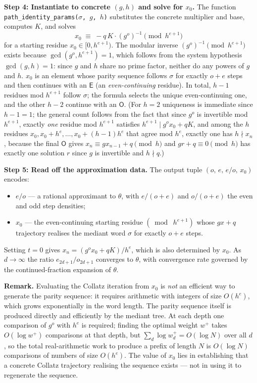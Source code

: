 \documentclass[12pt]{article}
\theoremstyle{definition}
\theoremstyle{remark}
\theoremstyle{plain}
\newcommand{\OO}{\mathsf{O}}
\newcommand{\EE}{\mathsf{E}}
\begin{document}
\medskip
\noindent\textbf{Step 4: Instantiate to concrete $(g, h)$ and solve for $x_0$.}
The function \texttt{path\_identity\_params($\sigma$, $g$, $h$)} substitutes the
concrete multiplier and base, computes $K$, and solves
\[
  x_0 \;\equiv\; -q\,K \cdot (g^o)^{-1} \pmod{h^{e+1}}
\]
for a starting residue $x_0 \in [0, h^{e+1})$.
The modular inverse $(g^o)^{-1} \pmod{h^{e+1}}$ exists because $\gcd(g^o, h^{e+1}) = 1$,
which follows from the system hypothesis $\gcd(g, h) = 1$: since $g$ and $h$ share
no prime factor, neither do any powers of $g$ and $h$.
$x_0$ is an element whose parity sequence follows $\sigma$ for exactly $o + e$ steps
and then continues with an $\EE$ (an \emph{even-continuing} residue).
In total, $h-1$ residues mod $h^{e+1}$ follow $\sigma$; the formula selects the
unique even-continuing one, and the other $h-2$ continue with an $\OO$.
(For $h = 2$ uniqueness is immediate since $h-1=1$; the general count follows from
the fact that since $g^o$ is invertible mod $h^{e+1}$, exactly \emph{one} residue
mod $h^{e+1}$ satisfies $h^{e+1} \mid g^o x_0 + qK$, and among the $h$ residues
$x_0, x_0 + h^e, \ldots, x_0 + (h-1)h^e$ that agree mod $h^e$, exactly one has
$h \nmid x_n$, because the final $\OO$ gives $x_n \equiv gx_{n-1} + q \pmod{h}$
and $gr + q \equiv 0 \pmod{h}$ has exactly one solution $r$ since $g$ is invertible
and $h \nmid q$.)

\medskip
\noindent\textbf{Step 5: Read off the approximation data.}
The output tuple $(o,\, e,\, e/o,\, x_0)$ encodes:
\begin{itemize}
  \item $e/o$ --- a rational approximant to $\theta$, with $e/(o+e)$ and $o/(o+e)$
    the even and odd step densities;
  \item $x_0$ --- the even-continuing starting residue $(\bmod\; h^{e+1})$ whose $gx+q$
    trajectory realises the mediant word $\sigma$ for exactly $o + e$ steps.
\end{itemize}
Setting $t = 0$ gives $x_n = (g^o x_0 + qK) / h^e$, which is also determined by
$x_0$.
As $d \to \infty$ the ratio $e_{2d+1}/o_{2d+1}$ converges to $\theta$, with
convergence rate governed by the continued-fraction expansion of $\theta$.

\medskip
\noindent\textbf{Remark.}
Evaluating the Collatz iteration from $x_0$ is \emph{not} an efficient way to
generate the parity sequence: it requires arithmetic with integers of size
$O(h^e)$, which grows exponentially in the word length.
The parity sequence itself is produced directly and efficiently by the mediant
tree.  At each depth one comparison of $g^o$ with $h^e$ is required; finding
the optimal weight $w^+$ takes $O(\log w^+)$ comparisons at that depth, but
$\sum_d \log w^+_d = O(\log N)$ over all $d$, so the total real-arithmetic work
to produce a prefix of length $N$ is $O(\log N)$ comparisons of numbers of size
$O(h^e)$.
The value of $x_0$ lies in establishing that a concrete Collatz trajectory
realising the sequence exists --- not in using it to regenerate the sequence.
\end{document}
